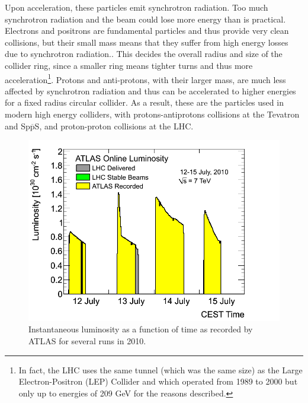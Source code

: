 Upon acceleration, these particles emit synchrotron radiation.
Too much synchrotron radiation and the beam could lose more energy
than is practical. 
Electrons and positrons are fundamental particles and thus provide
very clean collisions, but their small mass means that they suffer
from high energy losses due to synchrotron radiation.. 
This decides the overall radius and size of the collider ring, since a smaller
ring means tighter turns and thus more acceleration\footnote{In fact, 
the LHC uses the same tunnel (which was the same size) as 
the Large Electron-Positron (LEP) Collider and which
operated from 1989 to 2000 but only up to energies of 209 GeV for the reasons
described.}.
Protons and anti-protons, with their larger mass, 
are much less affected by synchrotron radiation
and thus can be accelerated to higher energies for a fixed radius 
circular collider. As a result, these are the particles used
in modern high energy colliders, with protons-antiprotons collisions
at the Tevatron and Sp$\overline{\textrm{p}}$S, and proton-proton
collisions at the LHC.


\begin{figure}[ht]
\centering
\includegraphics[width=.7\textwidth]{figures/lhc/instantaneouslumi.png}
\caption{Instantaneous luminosity as a function of time
as recorded by ATLAS for several runs in 2010.}
\label{fig:lhc_inst_lumi}
\end{figure}

